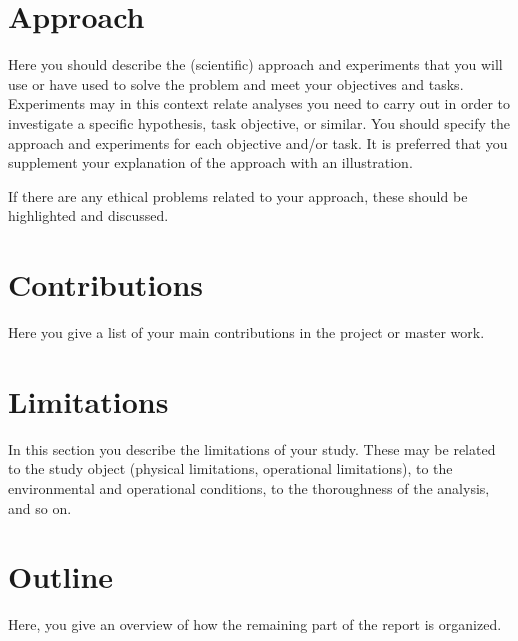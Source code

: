 \section{Approach}
\label{sec:approach}
\begin{info}
	Here you should describe the (scientific) approach and experiments that you will use or have used to solve the problem and meet your objectives and tasks. Experiments may in this context relate analyses you need to carry out in order to investigate a specific hypothesis, task objective, or similar. You should specify the approach and experiments for each objective and/or task. It is preferred that you supplement your explanation of the approach with an illustration.

	If there are any ethical problems related to your approach, these should be highlighted and discussed.
\end{info}



\section{Contributions}
\label{sec:contributions}
\begin{info}
	Here you give a list of your main contributions in the project or master work.
\end{info}



\section{Limitations}
\label{sec:limitations}
\begin{info}
	In this section you describe the limitations of your study. These may be related to the study object (physical limitations, operational limitations), to the environmental and operational conditions, to the thoroughness of the analysis, and so on.
\end{info}



\section{Outline}
\label{sec:outline}
\begin{info}
	Here, you give an overview of how the remaining part of the report is organized.
\end{info}

